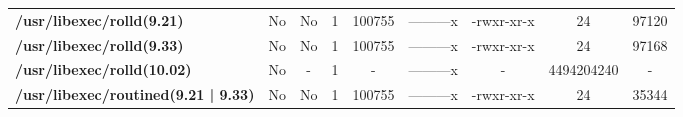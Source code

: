 \begin{center}
{\begin{tabular}{|>{\bfseries} l | C | C | C | C | C | C | C | C |}
					/usr/libexec/rolld(9.21) & No & No & \color{green}1 & \color{red}100755 & \color{green}---------x & \color{red}-rwxr-xr-x & \color{green}24 & \color{red}97120\\ 
					/usr/libexec/rolld(9.33) & No & No & \color{green}1 & \color{red}100755 & \color{green}---------x & \color{red}-rwxr-xr-x & \color{green}24 & \color{red}97168\\ 
					/usr/libexec/rolld(10.02) & No & - & 1 & - & ---------x & - & 4494204240 & -\\ 
					/usr/libexec/routined(9.21 | 9.33) & No & No & \color{green}1 & \color{red}100755 & \color{green}---------x & \color{red}-rwxr-xr-x & \color{green}24 & \color{red}35344\\ 

			\end{tabular}
		}
	\end{center}



